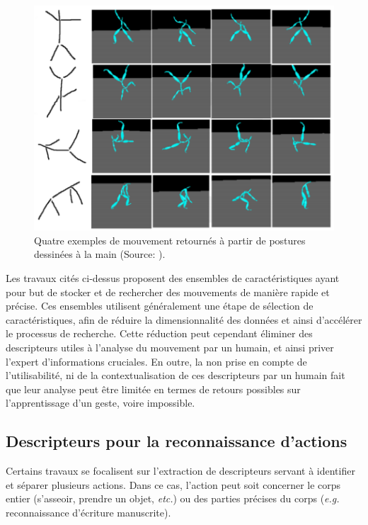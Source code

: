 \begin{figure}[h]
    \centering
    \includegraphics[width=\textwidth]{pictures/posture_retrieval.png}
    \caption[Mouvement retournés à partir de postures dessinées \parencite{Sakurai2015Ros}]{Quatre exemples de mouvement retournés à partir de postures dessinées à la main (Source: \parencite{Sakurai2015Ros}).}
    \label{fig:posture_retrieval}
\end{figure}

Les travaux cités ci-dessus proposent des ensembles de caractéristiques ayant pour but de stocker et de rechercher des mouvements de manière rapide et précise. Ces ensembles utilisent généralement une étape de sélection de caractéristiques, afin de réduire la dimensionnalité des données et ainsi d'accélérer le processus de recherche. Cette réduction peut cependant éliminer des descripteurs utiles à l'analyse du mouvement par un humain, et ainsi priver l'expert d'informations cruciales. En outre, la non prise en compte de l'utilisabilité, ni de la contextualisation de ces descripteurs par un humain fait que leur analyse peut être limitée en termes de retours possibles sur l'apprentissage d'un geste, voire impossible.


\subsection{Descripteurs pour la reconnaissance d'actions}
Certains travaux se focalisent sur l'extraction de descripteurs servant à identifier et séparer plusieurs actions. Dans ce cas, l'action peut soit concerner le corps entier (s'asseoir, prendre un objet, \textit{etc.}) ou des parties précises du corps (\textit{e.g.} reconnaissance d'écriture manuscrite).


